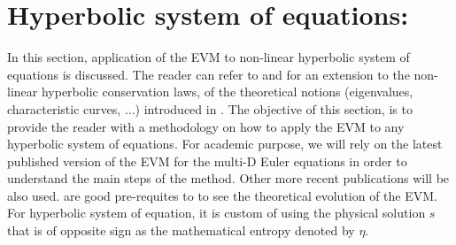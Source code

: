\section{Hyperbolic system of equations:}\label{sec:hyp_sect1b}
In this section, application of the EVM to non-linear hyperbolic system of equations is discussed. The reader can refer to \cite{Toro} and \cite{Leveque} for an extension to the non-linear hyperbolic conservation laws, of the theoretical notions (eigenvalues, characteristic curves, $\dots$) introduced in . The objective of this section, is to provide the reader with a methodology on how to apply the EVM to any hyperbolic system of equations. For academic purpose, we will rely on the latest published version of the EVM \cite{valentin} for the multi-D Euler equations in order to understand the main steps of the method. Other more recent publications will be also used. \cite{jlg, jlg2} are good pre-requites to \cite{valentin} to see the theoretical evolution of the EVM. For hyperbolic system of equation, it is custom of using the physical solution $s$ that is of opposite sign as the mathematical entropy denoted by $\eta$.\\

